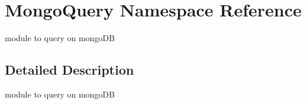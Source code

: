 \hypertarget{namespaceMongoQuery}{}\section{Mongo\+Query Namespace Reference}
\label{namespaceMongoQuery}


module to query on mongo\+DB  




\subsection{Detailed Description}
module to query on mongo\+DB 